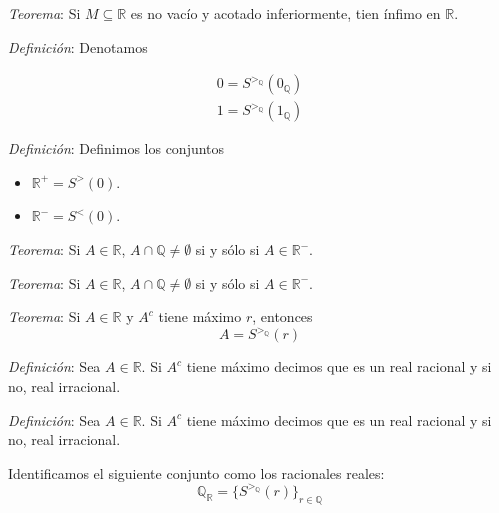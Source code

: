 \documentclass{beamer}
\begin{document}
  \begin{frame}
    \textit{Teorema}: Si $M \subseteq \mathbb{R}$ es no vacío y acotado inferiormente, 
    tien ínfimo en $\mathbb{R}$.
    \newline\newline

    \textit{Definición}: Denotamos 

    \begin{equation*}
      \begin{aligned}
        0 = S^{>_\mathbb{Q}}(0_\mathbb{Q}) \\
        1 = S^{>_\mathbb{Q}}(1_\mathbb{Q})
      \end{aligned}
    \end{equation*}
  \end{frame}

  \begin{frame}
    \textit{Definición}: Definimos los conjuntos 

    \begin{itemize}
      \item $\mathbb{R}^+ = S^>(0)$.
      \item $\mathbb{R}^- = S^<(0)$.
    \end{itemize}
  \end{frame}

  \begin{frame}
    \textit{Teorema}: Si $A \in \mathbb{R}$, $A \cap \mathbb{Q} \neq \emptyset$ si y sólo si
    $A \in \mathbb{R}^-$.
  \end{frame}

  \begin{frame}
    \textit{Teorema}: Si $A \in \mathbb{R}$, $A \cap \mathbb{Q} \neq \emptyset$ si y sólo si
    $A \in \mathbb{R}^-$.
    \newline\newline

    \textit{Teorema}: Si $A \in \mathbb{R}$ y $A^c$ tiene máximo $r$, entonces 
    \[A = S^{>_\mathbb{Q}}(r)\]
  \end{frame}

  \begin{frame}
    \textit{Definición}: Sea $A \in \mathbb{R}$. Si $A^c$ tiene máximo decimos que es 
    un real racional y si no, real irracional.
  \end{frame}

  \begin{frame}
    \textit{Definición}: Sea $A \in \mathbb{R}$. Si $A^c$ tiene máximo decimos que es 
    un real racional y si no, real irracional.
    \newline\newline

    Identificamos el siguiente conjunto como los racionales reales:
    \[\mathbb{Q}_\mathbb{R} = \{S^{>_\mathbb{Q}}(r)\}_{r \in \mathbb{Q}}\]
  \end{frame}
\end{document}
